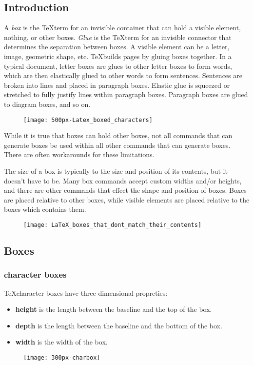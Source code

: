 \subsection{Introduction}
A \emph{box} is the \TeX term for an invisible container that can hold a
visible element, nothing, or other boxes. \emph{Glue} is the \TeX term for
an invisible connector that determines the separation between boxes. A 
visible element can be a letter, image, geometric shape, etc. \TeX builds 
pages by gluing boxes together. In a typical document, letter boxes are glues 
to other letter boxes to form words, which are then elastically glued to 
other words to form sentences. Sentences are broken into lines and placed 
in paragraph boxes. Elastic glue is squeezed or stretched to fully justify 
lines within paragraph boxes. Paragraph boxes are glued to diagram boxes, 
and so on.
\begin{figure}[htp]
    \centering
    \texttt{[image: 500px-Latex\_boxed\_characters]}
\end{figure}

While it is true that boxes can hold other boxes, not all commands that can 
generate boxes be used within all other commands that can generate boxes. 
There are often workarounds for these limitations.

The size of a box is typically to the size and position of its contents,
but it doesn't have to be. Many box commands accept custom widths and/or
heights, and there are other commands that effect the shape and position 
of boxes. Boxes are placed relative to other boxes, while visible elements
are placed relative to the boxes which contains them.
\begin{figure}[htp]
    \centering
    \texttt{[image: LaTeX\_boxes\_that\_dont\_match\_their\_contents]}
\end{figure}
\subsection{Boxes}

\subsubsection{character boxes}
\TeX character boxes have three dimensional propreties:
\begin{itemize}
    \item \textbf{height} is the length between the baseline and the top of the box.
    \item \textbf{depth} is the length between the baseline and the bottom of the box.
    \item \textbf{width} is the width of the box.
\end{itemize}
\begin{figure}[htp]
    \centering
    \texttt{[image: 300px-charbox]}
\end{figure}

